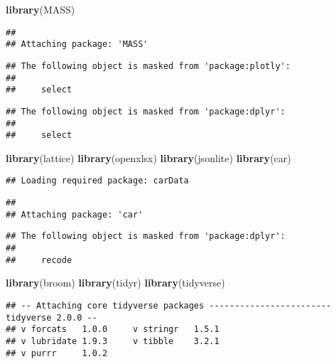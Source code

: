 \documentclass[
]{article}
\newenvironment{Shaded}{\begin{snugshade}}{\end{snugshade}}
\newcommand{\FunctionTok}[1]{\textcolor[rgb]{0.13,0.29,0.53}{\textbf{#1}}}
\newcommand{\NormalTok}[1]{#1}
\begin{document}
\begin{Shaded}
\begin{Highlighting}[]
\FunctionTok{library}\NormalTok{(MASS)}
\end{Highlighting}
\end{Shaded}

\begin{verbatim}
## 
## Attaching package: 'MASS'
\end{verbatim}

\begin{verbatim}
## The following object is masked from 'package:plotly':
## 
##     select
\end{verbatim}

\begin{verbatim}
## The following object is masked from 'package:dplyr':
## 
##     select
\end{verbatim}

\begin{Shaded}
\begin{Highlighting}[]
\FunctionTok{library}\NormalTok{(lattice)}
\FunctionTok{library}\NormalTok{(openxlsx)}
\FunctionTok{library}\NormalTok{(jsonlite)}
\FunctionTok{library}\NormalTok{(car)}
\end{Highlighting}
\end{Shaded}

\begin{verbatim}
## Loading required package: carData
\end{verbatim}

\begin{verbatim}
## 
## Attaching package: 'car'
\end{verbatim}

\begin{verbatim}
## The following object is masked from 'package:dplyr':
## 
##     recode
\end{verbatim}

\begin{Shaded}
\begin{Highlighting}[]
\FunctionTok{library}\NormalTok{(broom)}
\FunctionTok{library}\NormalTok{(tidyr)}
\FunctionTok{library}\NormalTok{(tidyverse)}
\end{Highlighting}
\end{Shaded}

\begin{verbatim}
## -- Attaching core tidyverse packages ------------------------ tidyverse 2.0.0 --
## v forcats   1.0.0     v stringr   1.5.1
## v lubridate 1.9.3     v tibble    3.2.1
## v purrr     1.0.2
\end{verbatim}
\end{document}
